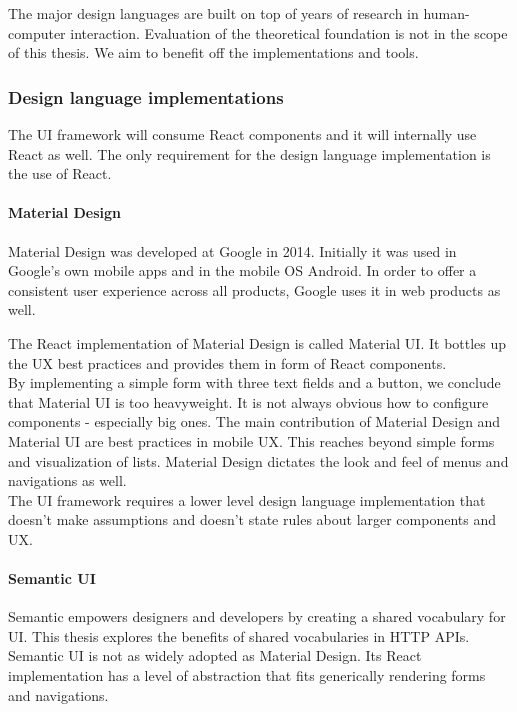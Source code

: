 {The major design languages are built on top of years of research in human-computer interaction. Evaluation of the theoretical foundation is not in the scope of this thesis. We aim to benefit off the implementations and tools.

\subsubsection{Design language implementations}
The UI framework will consume React components and it will internally use React as well. The only requirement for the design language implementation is the use of React.

\paragraph{Material Design}
Material Design was developed at Google in 2014. Initially it was used in Google's own mobile apps and in the mobile OS Android. In order to offer a consistent user experience across all products, Google uses it in web products as well.

The React implementation of Material Design is called Material UI. It bottles up the UX best practices and provides them in form of React components. \\
By implementing a simple form with three text fields and a button, we conclude that Material UI is too heavyweight. It is not always obvious how to configure components - especially big ones. The main contribution of Material Design and Material UI are best practices in mobile UX. This reaches beyond simple forms and visualization of lists. Material Design dictates the look and feel of menus and navigations as well. \\
The UI framework requires a lower level design language implementation that doesn't make assumptions and doesn't state rules about larger components and UX.

\paragraph{Semantic UI}
Semantic empowers designers and developers by creating a shared vocabulary for UI. \citep{semanticui} This thesis explores the benefits of shared vocabularies in HTTP APIs. Semantic UI is not as widely adopted as Material Design. Its React implementation has a level of abstraction that fits generically rendering forms and navigations.

}
